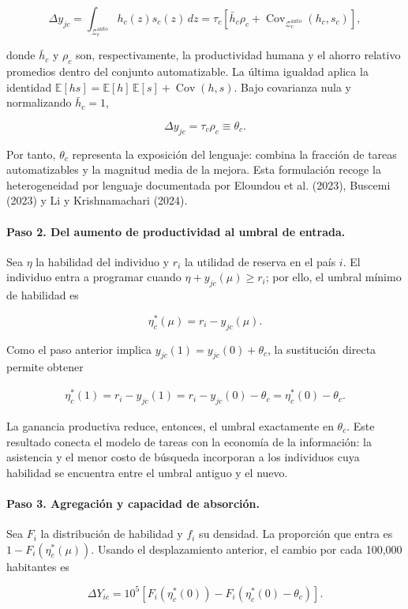 \documentclass[12pt,a4paper]{article}
\newcommand{\Zauto}{\mathcal{Z}^{\mathrm{auto}}_c}
\newcommand{\Covauto}{\operatorname{Cov}_{\Zauto}}
\newcommand{\dd}{\,dz}
\begin{document}
\[
\Delta y_{jc}=\int_{\Zauto}h_c(z)s_c(z)\dd
=\tau_c\left[\bar h_c\rho_c+\Covauto(h_c,s_c)\right],
\]

donde $\bar h_c$ y $\rho_c$ son, respectivamente, la productividad humana y el ahorro relativo promedios dentro del conjunto automatizable. La última igualdad aplica la identidad $\mathbb{E}[hs]=\mathbb{E}[h]\,\mathbb{E}[s]+\operatorname{Cov}(h,s)$. Bajo covarianza nula y normalizando $\bar h_c=1$,

\[
\Delta y_{jc}=\tau_c\rho_c\equiv\theta_c.
\]

Por tanto, $\theta_c$ representa la exposición del lenguaje: combina la fracción de tareas automatizables y la magnitud media de la mejora. Esta formulación recoge la heterogeneidad por lenguaje documentada por Eloundou et al. (2023), Buscemi (2023) y Li y Krishnamachari (2024).

\paragraph{Paso 2. Del aumento de productividad al umbral de entrada.} Sea $\eta$ la habilidad del individuo y $r_i$ la utilidad de reserva en el país $i$. El individuo entra a programar cuando $\eta+y_{jc}(\mu)\geq r_i$; por ello, el umbral mínimo de habilidad es

\[
\eta_c^*(\mu)=r_i-y_{jc}(\mu).
\]

Como el paso anterior implica $y_{jc}(1)=y_{jc}(0)+\theta_c$, la sustitución directa permite obtener

\[
\begin{aligned}
\eta_c^*(1)=r_i-y_{jc}(1)
=r_i-y_{jc}(0)-\theta_c=\eta_c^*(0)-\theta_c.
\end{aligned}
\]

La ganancia productiva reduce, entonces, el umbral exactamente en $\theta_c$. Este resultado conecta el modelo de tareas con la economía de la información: la asistencia y el menor costo de búsqueda incorporan a los individuos cuya habilidad se encuentra entre el umbral antiguo y el nuevo.

\paragraph{Paso 3. Agregación y capacidad de absorción.} Sea $F_i$ la distribución de habilidad y $f_i$ su densidad. La proporción que entra es $1-F_i(\eta_c^*(\mu))$. Usando el desplazamiento anterior, el cambio por cada 100,000 habitantes es

\[
\Delta Y_{ic}=10^5\left[F_i(\eta_c^*(0))-F_i(\eta_c^*(0)-\theta_c)\right].
\]
\end{document}

